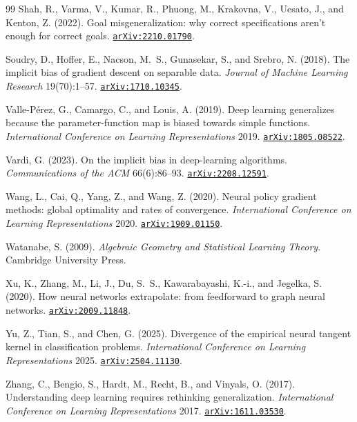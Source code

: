 \documentclass[11pt]{amsart}
\newcommand{\arxiv}[1]{\href{https://arxiv.org/abs/#1}{\texttt{arXiv:#1}}}
\theoremstyle{plain}
\theoremstyle{definition}
\begin{document}
\begin{thebibliography}{99}
 Shah, R., Varma, V., Kumar, R., Phuong, M., Krakovna, V., Uesato, J., and Kenton, Z. (2022). Goal misgeneralization: why correct specifications aren't enough for correct goals. \arxiv{2210.01790}.

 Soudry, D., Hoffer, E., Nacson, M.~S., Gunasekar, S., and Srebro, N. (2018). The implicit bias of gradient descent on separable data. \emph{Journal of Machine Learning Research} 19(70):1--57. \arxiv{1710.10345}.

 Valle-P\'erez, G., Camargo, C., and Louis, A. (2019). Deep learning generalizes because the parameter-function map is biased towards simple functions. \emph{International Conference on Learning Representations} 2019. \arxiv{1805.08522}.

 Vardi, G. (2023). On the implicit bias in deep-learning algorithms. \emph{Communications of the ACM} 66(6):86--93. \arxiv{2208.12591}.

 Wang, L., Cai, Q., Yang, Z., and Wang, Z. (2020). Neural policy gradient methods: global optimality and rates of convergence. \emph{International Conference on Learning Representations} 2020. \arxiv{1909.01150}.

 Watanabe, S. (2009). \emph{Algebraic Geometry and Statistical Learning Theory}. Cambridge University Press.

 Xu, K., Zhang, M., Li, J., Du, S.~S., Kawarabayashi, K.-i., and Jegelka, S. (2020). How neural networks extrapolate: from feedforward to graph neural networks. \arxiv{2009.11848}.

 Yu, Z., Tian, S., and Chen, G. (2025). Divergence of the empirical neural tangent kernel in classification problems. \emph{International Conference on Learning Representations} 2025. \arxiv{2504.11130}.

 Zhang, C., Bengio, S., Hardt, M., Recht, B., and Vinyals, O. (2017). Understanding deep learning requires rethinking generalization. \emph{International Conference on Learning Representations} 2017. \arxiv{1611.03530}.

\end{thebibliography}
\end{document}

